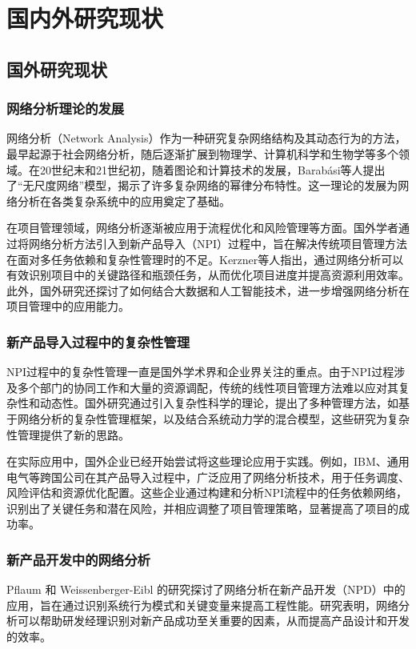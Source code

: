 \chapter{国内外研究现状}

\section{国外研究现状}

\subsection{网络分析理论的发展}
网络分析（Network Analysis）作为一种研究复杂网络结构及其动态行为的方法，最早起源于社会网络分析，随后逐渐扩展到物理学、计算机科学和生物学等多个领域\cite{Newman2003Structure}。在20世纪末和21世纪初，随着图论和计算技术的发展，Barabási等人提出了“无尺度网络”模型，揭示了许多复杂网络的幂律分布特性\cite{Barabasi2002Linked}。这一理论的发展为网络分析在各类复杂系统中的应用奠定了基础。

在项目管理领域，网络分析逐渐被应用于流程优化和风险管理等方面。国外学者通过将网络分析方法引入到新产品导入（NPI）过程中，旨在解决传统项目管理方法在面对多任务依赖和复杂性管理时的不足。Kerzner等人\cite{Kerzner2017Project}指出，通过网络分析可以有效识别项目中的关键路径和瓶颈任务，从而优化项目进度并提高资源利用效率。此外，国外研究还探讨了如何结合大数据和人工智能技术，进一步增强网络分析在项目管理中的应用能力。

\subsection{新产品导入过程中的复杂性管理}
NPI过程中的复杂性管理一直是国外学术界和企业界关注的重点。由于NPI过程涉及多个部门的协同工作和大量的资源调配，传统的线性项目管理方法难以应对其复杂性和动态性。国外研究通过引入复杂性科学的理论，提出了多种管理方法，如基于网络分析的复杂性管理框架，以及结合系统动力学的混合模型\cite{Sterman2000SystemDynamics}，这些研究为复杂性管理提供了新的思路。

在实际应用中，国外企业已经开始尝试将这些理论应用于实践。例如，IBM、通用电气等跨国公司在其产品导入过程中，广泛应用了网络分析技术，用于任务调度、风险评估和资源优化配置。这些企业通过构建和分析NPI流程中的任务依赖网络，识别出了关键任务和潜在风险，并相应调整了项目管理策略，显著提高了项目的成功率。

\subsection{新产品开发中的网络分析}
Pflaum 和 Weissenberger-Eibl 的研究\cite{pflaum2017using}探讨了网络分析在新产品开发（NPD）中的应用，旨在通过识别系统行为模式和关键变量来提高工程性能。研究表明，网络分析可以帮助研发经理识别对新产品成功至关重要的因素，从而提高产品设计和开发的效率。

